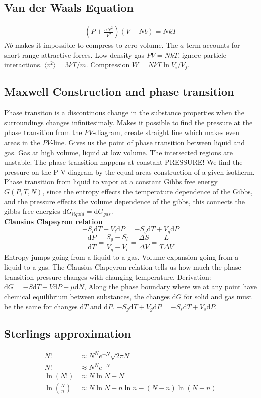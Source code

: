 \documentclass[a4paper, norsk, 8pt]{article}
\begin{document}
\begin{multicols*}{3}
\subsection*{\footnotesize  Van der Waals Equation}
\begin{align*}
    \left( P + \frac{aN^2}{V^2}\right)\left(V-Nb\right) = NkT
\end{align*}
$Nb$ makes it impossible to compress to zero volume. The $a$ term accounts for short range attractive forces.
Low density gas $PV=NkT$, ignore particle interactions. $\langle v^2 \rangle = 3kT/m$. Compression $W =NkT\ln{V_i/V_f}$.

\subsection*{\footnotesize Maxwell Construction and phase transition}
Phase transiton is a discontinous change in the substance properties when the surroundings changes infinitesimaly.
Makes it possible to find the pressure at the phase transition from the $PV$-diagram, create straight line which makes even areas in the $PV$-line. Gives us the point of phase transition between liquid and gas. Gas at high volume, liquid at low volume. The intersected regions are unstable. The phase transition happens at constant PRESSURE! We find the pressure on the P-V diagram by the equal areas construction of a given isotherm.\\
Phase transition from liquid to vapor at a constant Gibbs free energy $G(P, T, N)$, since the entropy effects the temperature dependence of the Gibbs, and the pressure effects the volume dependence of the gibbs, this connects the gibbs free energies $\mbox{d}G_{liquid} = \mbox{d}G_{gas}$.\\
\textbf{Clausius Clapeyron relation}
$$-S_l\mbox{d}T + V_l\mbox{d}P = -S_g\mbox{d}T+V_g\mbox{d}P $$
$$ \frac{\mbox{d}P}{\mbox{d}T} = \frac{S_g-S_l}{V_g-V_l} = \frac{\Delta S}{\Delta V} = \frac{L}{T\Delta V}$$
Entropy jumps going from a liquid to a gas. Volume expansion going from a liquid to a gas. The Clausius Clapeyron relation tells us how much the phase transition pressure changes with changing temperature. Derivation: $\mbox{d}G = −S\mbox{d}T +V\mbox{d}P +\mu\mbox{d}N$,
Along the phase boundary where we at any point have chemical equilibrium between
substances, the changes $\mbox{d}G$ for solid and gas must be the same for changes $\mbox{d}T$ and $\mbox{d}P$.
$−S_g\mbox{d}T +V_g\mbox{d}P = −S_s\mbox{d}T +V_s\mbox{d}P$.

\subsection*{\footnotesize  Sterlings approximation}
\begin{align*}
  N! &\approx N^Ne^{-N}\sqrt{2\pi N} \\
  N! &\approx N^Ne^{-N} \\
  \ln{(N!)} &\approx N\ln{N}-N \\
  \ln{\binom{N}{n}}  &\approx N\ln{N}-n\ln{n}-(N-n)\ln{\left(N-n\right)}
\end{align*}



\end{multicols*}
\end{document}
